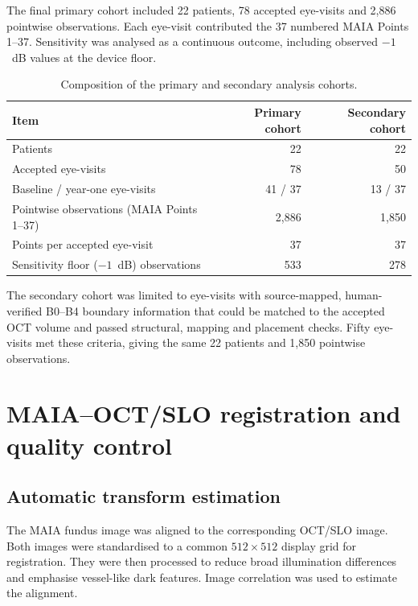 The final primary cohort included 22 patients, 78 accepted eye-visits and 2,886 pointwise observations. Each eye-visit contributed the 37 numbered MAIA Points 1--37. Sensitivity was analysed as a continuous outcome, including observed $-1$~dB values at the device floor.

\begin{table}[htbp]
\centering
\caption{Composition of the primary and secondary analysis cohorts.}
\label{tab:cohort}
\begin{tabularx}{\textwidth}{Xrr}
\toprule
Item & Primary cohort & Secondary cohort \\
\midrule
Patients & 22 & 22 \\
Accepted eye-visits & 78 & 50 \\
Baseline / year-one eye-visits & 41 / 37 & 13 / 37 \\
Pointwise observations (MAIA Points 1--37) & 2,886 & 1,850 \\
Points per accepted eye-visit & 37 & 37 \\
Sensitivity floor ($-1$~dB) observations & 533 & 278 \\
\bottomrule
\end{tabularx}
\end{table}

The secondary cohort was limited to eye-visits with source-mapped, human-verified B0--B4 boundary information that could be matched to the accepted OCT volume and passed structural, mapping and placement checks. Fifty eye-visits met these criteria, giving the same 22 patients and 1,850 pointwise observations.

\section{MAIA--OCT/SLO registration and quality control}
\label{sec:registration}

\subsection{Automatic transform estimation}

The MAIA fundus image was aligned to the corresponding OCT/SLO image. Both images were standardised to a common $512\times512$ display grid for registration. They were then processed to reduce broad illumination differences and emphasise vessel-like dark features. Image correlation was used to estimate the alignment.

